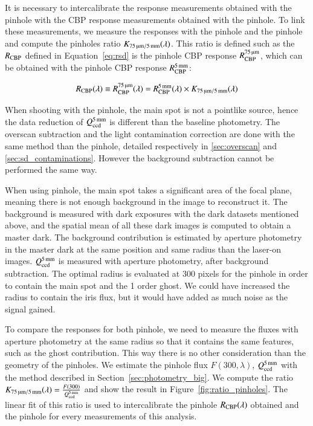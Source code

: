 It is necessary to intercalibrate the \SD response measurements obtained with the \spinhole pinhole with the CBP response measurements obtained with the \bpinhole pinhole. To link these measurements, we measure the \SD responses with the \spinhole pinhole and the \bpinhole pinhole and compute the pinholes ratio $K_\mathrm{\SI{75}{\micro\meter}/\SI{5}{\milli\meter}}(\lambda)$. This ratio is defined such as the $R_{\mathrm{CBP}}$ defined in Equation~\ref{eq:rsd} is the \spinhole pinhole CBP response $R_{\mathrm{CBP}}^{\SI{75}{\micro\meter}}$, which can be obtained with the \bpinhole pinhole CBP response $R_{\mathrm{CBP}}^{\SI{5}{\milli\meter}}$:

\begin{equation}
	R_{\mathrm{CBP}}(\lambda) \equiv R_{\mathrm{CBP}}^{\SI{75}{\micro\meter}}(\lambda) = R_{\mathrm{CBP}}^{\SI{5}{\milli\meter}}(\lambda) \times K_\mathrm{\SI{75}{\micro\meter}/\SI{5}{\milli\meter}}(\lambda)
\end{equation}

When shooting with the \bpinhole pinhole, the main spot is not a pointlike source, hence the data reduction of $Q_{\mathrm{ccd}}^{\SI{5}{\milli\meter}}$ is different than the baseline photometry. The overscan subtraction and the light contamination correction are done with the same method than the \spinhole pinhole, detailed respectively in \ref{sec:overscan} and \ref{sec:sd_contaminations}. However the background subtraction cannot be performed the same way. 

When using \bpinhole pinhole, the main spot takes a significant area of the focal plane, meaning there is not enough background in the image to reconstruct it. The background is measured with dark exposures with the dark datasets mentioned above, and the spatial mean of all these dark images is computed to obtain a master dark. The background contribution is estimated by aperture photometry in the master dark at the same position and same radius than the laser-on images. $Q_{\mathrm{ccd}}^{\SI{5}{\milli\meter}}$ is measured with aperture photometry, after background subtraction. The optimal radius is evaluated at 300 pixels for the \bpinhole pinhole in order to contain the main spot and the 1 order ghost. We could have increased the radius to contain the iris flux, but it would have added as much noise as the signal gained. 

To compare the \SD responses for both pinhole, we need to measure the fluxes with aperture photometry at the same radius so that it contains the same features, such as the ghost contribution. This way there is no other consideration than the geometry of the pinholes. We estimate the \spinhole pinhole flux $F(300, \lambda)$, $Q_{\mathrm{ccd}}^{\SI{5}{\milli\meter}}$ with the method described in Section~\ref{sec:photometry_big}. We compute the ratio $K_\mathrm{\SI{75}{\micro\meter}/\SI{5}{\milli\meter}}(\lambda)=\frac{F(300)}{Q_{\mathrm{ccd}}^{\SI{5}{\milli\meter}}}$ and show the result in Figure~\ref{fig:ratio_pinholes}. The linear fit of this ratio is used to intercalibrate the \bpinhole pinhole $R_{\mathrm{CBP}}(\lambda)$ obtained and the \spinhole pinhole \SD for every measurements of this analysis.

